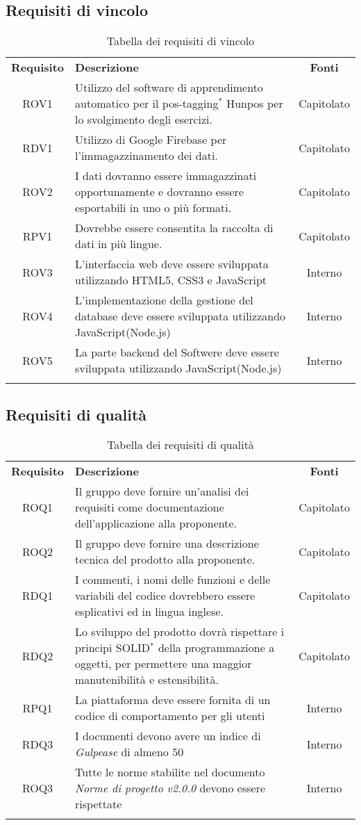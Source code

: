 \subsection{Requisiti di vincolo}
\begin{longtable}{| c | p{10cm} | c |}
		\rowcolor{LightBlue}
		\color{white}\bfseries Requisito & \color{white}\bfseries Descrizione & \color{white}\bfseries Fonti\\[0.25cm]
		ROV1 & Utilizzo del software di apprendimento automatico per il pos-tagging$^*$ Hunpos per lo svolgimento degli esercizi. & Capitolato \\
		RDV1 & Utilizzo di Google Firebase per l'immagazzinamento dei dati. & Capitolato \\
		ROV2 & I dati dovranno essere immagazzinati opportunamente e dovranno essere esportabili in uno o più formati. & Capitolato \\
		RPV1 & Dovrebbe essere consentita la raccolta di dati in più lingue. & Capitolato \\ 
		ROV3 & L’interfaccia web deve essere sviluppata utilizzando HTML5, CSS3 e JavaScript & Interno\\
		ROV4 & L'implementazione della gestione del database deve essere sviluppata utilizzando JavaScript(Node.js) & Interno\\
		ROV5 & La parte backend del Softwere deve essere sviluppata utilizzando JavaScript(Node.js) & Interno\\
		\hline
		\caption{Tabella dei requisiti di vincolo}
\end{longtable}

\subsection{Requisiti di qualità}
\begin{longtable}{| c | p{10cm} | c |}
		\rowcolor{LightBlue}
		\color{white}\bfseries Requisito & \color{white}\bfseries Descrizione & \color{white}\bfseries Fonti\\[0.25cm]
		ROQ1 & Il gruppo deve fornire un'analisi dei requisiti come documentazione dell'applicazione alla proponente. & Capitolato \\
		ROQ2 & Il gruppo deve fornire una descrizione tecnica del prodotto alla proponente. & Capitolato \\ 
		RDQ1 & I commenti, i nomi delle funzioni e delle variabili del codice dovrebbero essere esplicativi ed in lingua inglese. & Capitolato \\ 
		RDQ2 & Lo sviluppo del prodotto dovrà rispettare i principi SOLID$^*$ della programmazione a oggetti, per permettere una maggior manutenibilità e estensibilità. & Capitolato \\
		RPQ1 & La piattaforma deve essere fornita di un codice di comportamento per gli utenti & Interno\\
		RDQ3 & I documenti devono avere un indice di \textit{Gulpease} di almeno 50 & Interno\\
		ROQ3 & Tutte le norme stabilite nel documento \textit{Norme di progetto v2.0.0} devono essere rispettate & Interno\\
		\hline
		\caption{Tabella dei requisiti di qualità}
\end{longtable}